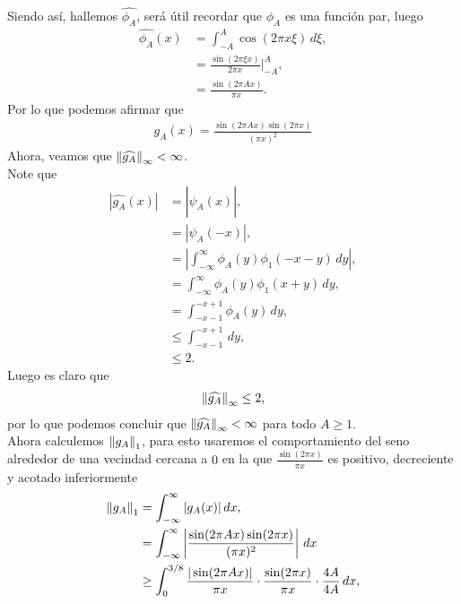 \begin{homeworkProblem}
\begin{solution}
\begin{enumerate}[(i)]
\begin{align*}
        \end{align*}
        Siendo así, hallemos $\hat{\phi_{A}}$, será útil recordar que $\phi_{A}$ es una función par, luego
        \begin{align*}
          \hat{\phi_{A}}(x)&=\int_{-A}^{A}\cos(2\pi x\xi)\, d\xi,\\
          &=\frac{\sin(2\pi \xi x)}{2\pi x}\Bigg|_{-A}^{A},\\
          &=\frac{\sin(2\pi Ax)}{\pi x}.
        \end{align*}
        Por lo que podemos afirmar que
        \begin{align*}
          g_{A}(x)=\frac{\sin(2\pi Ax)\sin(2\pi x)}{(\pi x)^2}
        \end{align*}
        Ahora, veamos que $\left\|\widehat{g_A}\right\|_{\infty}<\infty$.\\
        Note que
        \begin{align*}
          \left|\hat{g_{A}}(x)\right|&=\left|\hat{\hat{\psi_{A}}}(x)\right|,\\
          &=\left|\psi_{A}(-x)\right|,\\
          &=\left|\int_{-\infty}^{\infty}\phi_{A}(y)\phi_{1}(-x-y)\, dy\right|,\\
          &=\int_{-\infty}^{\infty}\phi_{A}(y)\phi_{1}(x+y)\, dy,\\
          &=\int_{-x-1}^{-x+1}\phi_{A}(y)\, dy,\\
          &\leq \int_{-x-1}^{-x+1}\, dy,\\
          &\leq 2.
        \end{align*}
        Luego es claro que
        \begin{align*}
          \left\|\widehat{g_A}\right\|_{\infty}\leq 2,
        \end{align*}
        por lo que podemos concluir que $\left\|\widehat{g_A}\right\|_{\infty}<\infty$ para todo $A\geq 1$.\\
        Ahora calculemos $\left\|g_A\right\|_{1}$, para esto usaremos el comportamiento del seno alrededor de una vecindad cercana a $0$ en la que $\frac{\sin(2\pi x)}{\pi x}$ es positivo, decreciente y acotado inferiormente
        \begin{align*}
          \norm{g_A}_{1}&=\int_{-\infty}^{\infty}|g_{A}(x)|\, dx,\\
          &=\int_{-\infty}^{\infty}\left| \frac{\sin(2\pi Ax)\sin(2\pi x)}{(\pi x)^2} \right|\, dx\\
          &\geq \int_{0}^{3/8}\frac{|\sin(2\pi Ax)|}{\pi x}\cdot\frac{\sin(2\pi x)}{\pi x}\cdot \frac{4A}{4A}\, dx,\\

\end{align*}
\end{enumerate}
\end{solution}
\end{homeworkProblem}
